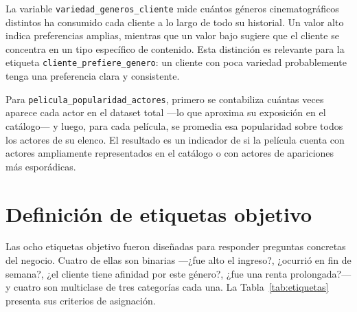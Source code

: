 \documentclass[12pt, a4paper]{report}
\newcommand{\variable}[1]{\texttt{\small #1}}
\begin{document}
La variable \variable{variedad\_generos\_cliente} mide cuántos géneros cinematográficos distintos ha consumido cada cliente a lo largo de todo su historial. Un valor alto indica preferencias amplias, mientras que un valor bajo sugiere que el cliente se concentra en un tipo específico de contenido. Esta distinción es relevante para la etiqueta \variable{cliente\_prefiere\_genero}: un cliente con poca variedad probablemente tenga una preferencia clara y consistente.

Para \variable{pelicula\_popularidad\_actores}, primero se contabiliza cuántas veces aparece cada actor en el dataset total ---lo que aproxima su exposición en el catálogo--- y luego, para cada película, se promedia esa popularidad sobre todos los actores de su elenco. El resultado es un indicador de si la película cuenta con actores ampliamente representados en el catálogo o con actores de apariciones más esporádicas.

\section{Definición de etiquetas objetivo}

Las ocho etiquetas objetivo fueron diseñadas para responder preguntas concretas del negocio. Cuatro de ellas son binarias ---¿fue alto el ingreso?, ¿ocurrió en fin de semana?, ¿el cliente tiene afinidad por este género?, ¿fue una renta prolongada?--- y cuatro son multiclase de tres categorías cada una. La Tabla~\ref{tab:etiquetas} presenta sus criterios de asignación.
\end{document}

